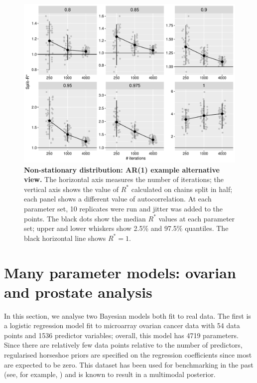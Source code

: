 \documentclass{article}
\begin{document}
\begin{figure}[!htb]
	\centerline{\includegraphics[width=1.0\textwidth]{../output/trends_ar1_transposed.pdf}}
	\caption{\textbf{Non-stationary distribution: AR(1) example alternative view.} The horizontal axis measures the number of iterations; the vertical axis shows the value of $R^*$ calculated on chains split in half; each panel shows a different value of autocorrelation. At each parameter set, 10 replicates were run and jitter was added to the points. The black dots show the median $R^*$ values at each parameter set; upper and lower whiskers show 2.5\% and 97.5\% quantiles. The black horizontal line shows $R^*=1$. }
	\label{fig:trends_ar1_transposed}
\end{figure}

\section{Many parameter models: ovarian and prostate analysis}\label{sec:prostate}
In this section, we analyse two Bayesian models both fit to real data. The first is a logistic regression model fit to microarray ovarian cancer data with 54 data points and 1536 predictor variables; overall, this model has 4719 parameters. Since there are relatively few data points relative to the number of predictors, regularised horseshoe priors are specified on the regression coefficients \citep{piironen2017sparsity} since most are expected to be zero. This dataset has been used for benchmarking in the past (see, for example, \cite{schummer1999comparative,hernandez2010expectation,paananen2019implicitly}) and is known to result in a multimodal posterior.
\end{document}
